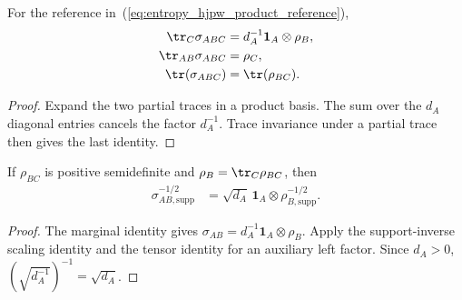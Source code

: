 \begin{theorem}
    \label{thm:entropy_maximally_mixed_tensor_marginals}
    \leanok
    For the reference in~(\ref{eq:entropy_hjpw_product_reference}),
    \begin{align}
        \tr_C\sigma_{ABC}
        &=d_A^{-1}\mathbf 1_A\otimes\rho_B,
        \notag\\
        \tr_{AB}\sigma_{ABC}
        &=\rho_C,
        \notag\\
        \tr(\sigma_{ABC})
        &=\tr(\rho_{BC}).
        \label{eq:entropy_mixed_reference_trace}
    \end{align}
\end{theorem}

\begin{proof}\leanok
    Expand the two partial traces in a product basis. The sum over the
    $d_A$ diagonal entries cancels the factor $d_A^{-1}$. Trace invariance under
    a partial trace then gives the last identity.
\end{proof}

\begin{theorem}
    \label{thm:entropy_maximally_mixed_support_inverse}
    \leanok
    If $\rho_{BC}$ is positive semidefinite and $\rho_B=\tr_C\rho_{BC}$, then
    \begin{align}
        \sigma_{AB,\mathrm{supp}}^{-1/2}
        &=\sqrt{d_A}\,\mathbf 1_A\otimes
          \rho_{B,\mathrm{supp}}^{-1/2}.
        \label{eq:entropy_mixed_reference_support_inverse}
    \end{align}
\end{theorem}

\begin{proof}\leanok
    The marginal identity gives
    $\sigma_{AB}=d_A^{-1}\mathbf 1_A\otimes\rho_B$.
    Apply the support-inverse scaling identity and the tensor identity for an
    auxiliary left factor. Since $d_A>0$,
    $(\sqrt{d_A^{-1}})^{-1}=\sqrt{d_A}$.
\end{proof}

